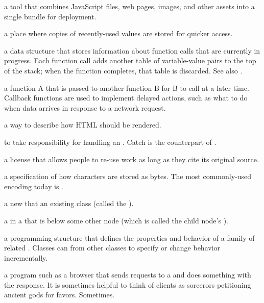 \begin{description}
a tool that combines JavaScript files, web pages, images, and other assets
into a single bundle for deployment.

a place where copies of recently-used values are stored for quicker access.

a data structure that stores information about function calls that are
currently in progress. Each function call adds another table of
variable-value pairs to the top of the stack; when the function completes,
that table is discarded. See also .

a function A that is passed to another function B for B to call at a later
time. Callback functions are used to implement delayed actions, such as what
to do when data arrives in response to a network request.

a way to describe how HTML should be rendered.

to take responsibility for handling an . Catch is
the counterpart of .

a license that allows people to re-use work as long as they cite its
original source.

a specification of how characters are stored as bytes. The most commonly-used
encoding today is .

a new  that  an existing class (called
the ).

a  in a  that is below some other node (which is
called the child node's ).

a programming structure that defines the properties and behavior of a family
of related . Classes can  from other
classes to specify or change behavior incrementally.

a program such as a browser that sends requests to a  and
does something with the response. It is sometimes helpful to think of clients
as sorcerors petitioning ancient gods for favors. Sometimes.


\end{description}
